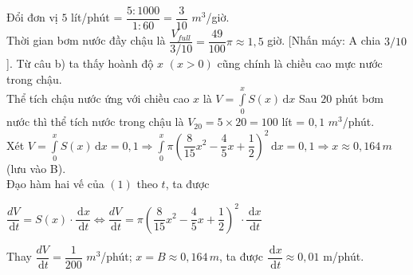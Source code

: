 \begin{ex}
{\begin{itemchoice}
         \itemch Đổi đơn vị $5$ lít/phút = $\dfrac{5\colon 1000}{1\colon 60}=\dfrac{3}{10}$ $m^3$/giờ.\\
         Thời gian bơm nước đầy chậu là $\dfrac{V_{full}}{3/10}=\dfrac{49}{100}\pi \approx 1{,}5$ giờ.   [Nhấn máy: A chia $3/10$].
         \itemch Từ câu b) ta thấy hoành độ $x$ $\left(x>0\right)$ cũng chính là chiều cao mực nước trong chậu.\\
         Thể tích chậu nước ứng với chiều cao $x$ là $V=\int\limits_0^x{S(x)\mathrm{\,d}x}$ 
         Sau $20$ phút bơm nước thì thể tích nước trong chậu là $V_{20}=5\times 20=100$ lít = $0{,}1$ $m^3$/phút.\\
         Xét $V=\int\limits_0^x{S(x)\mathrm{\,d}x}=0{,}1\Rightarrow \int\limits_0^x{\pi \left(\dfrac{8}{15}x^2-\dfrac{4}{5}x+\dfrac{1}{2}\right)^2\mathrm{\,d}x}=0{,}1\Rightarrow x\approx 0{,}164\,m$ (lưu vào B).\\
         Đạo hàm hai vế của $(1)$ theo $t$, ta được\\
         \centerline{$\dfrac{dV}{\mathrm{\,d}t}=S(x)\cdot \dfrac{\mathrm{\,d}x}{\mathrm{\,d}t}\Leftrightarrow \dfrac{dV}{\mathrm{\,d}t}=\pi \left(\dfrac{8}{15}x^2-\dfrac{4}{5}x+\dfrac{1}{2}\right)^2\cdot \dfrac{\mathrm{\,d}x}{\mathrm{\,d}t}$}
         Thay $\dfrac{dV}{\mathrm{\,d}t}=\dfrac{1}{200}\,\,m^3$/phút; $x=B\approx 0{,}164\,m$, ta được $\dfrac{\mathrm{\,d}x}{\mathrm{\,d}t}\approx 0{,}01$ m/phút.
     \end{itemchoice}
 }
\end{ex}
